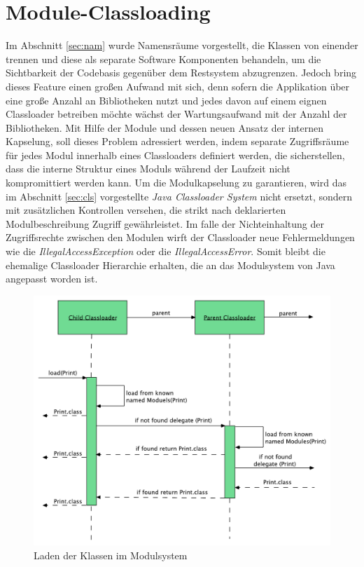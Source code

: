   \section{Module-Classloading} \label{sec:mod-cll}
    Im Abschnitt \ref{sec:nam} wurde Namensräume vorgestellt, die Klassen von einender trennen und diese als separate Software Komponenten behandeln, um die Sichtbarkeit der Codebasis gegenüber dem Restsystem abzugrenzen. Jedoch bring dieses Feature einen großen Aufwand mit sich, denn sofern die Applikation über eine große Anzahl an Bibliotheken nutzt und jedes davon auf einem eignen Classloader betreiben möchte wächst der Wartungsaufwand mit der Anzahl der Bibliotheken.\newline
    Mit Hilfe der Module und dessen neuen Ansatz der internen Kapselung, soll dieses Problem adressiert werden, indem separate Zugriffsräume für jedes Modul innerhalb eines Classloaders definiert werden, die sicherstellen, dass die interne Struktur eines Moduls während der Laufzeit nicht kompromittiert werden kann.\newline
    Um die Modulkapselung zu garantieren, wird das im Abschnitt \ref{sec:cls} vorgestellte \textit{Java Classloader System} nicht ersetzt, sondern mit zusätzlichen Kontrollen versehen, die strikt nach deklarierten Modulbeschreibung Zugriff gewährleistet. Im falle der Nichteinhaltung der Zugriffsrechte zwischen den Modulen wirft der Classloader neue Fehlermeldungen wie die \textit{IllegalAccessException} oder die \textit{IllegalAccessError}. Somit bleibt die ehemalige Classloader Hierarchie erhalten, die an das Modulsystem von Java angepasst worden ist.\cite{classLoadingOracle,modulMitJava9}\bigbreak

    \begin{figure}[h!]
      \centering{}
      \includegraphics[width=\textwidth]{material/images/Module-Classloading.pdf}
      \caption{Laden der Klassen im Modulsystem}
      \label{fig:mcl}
  \end{figure}

